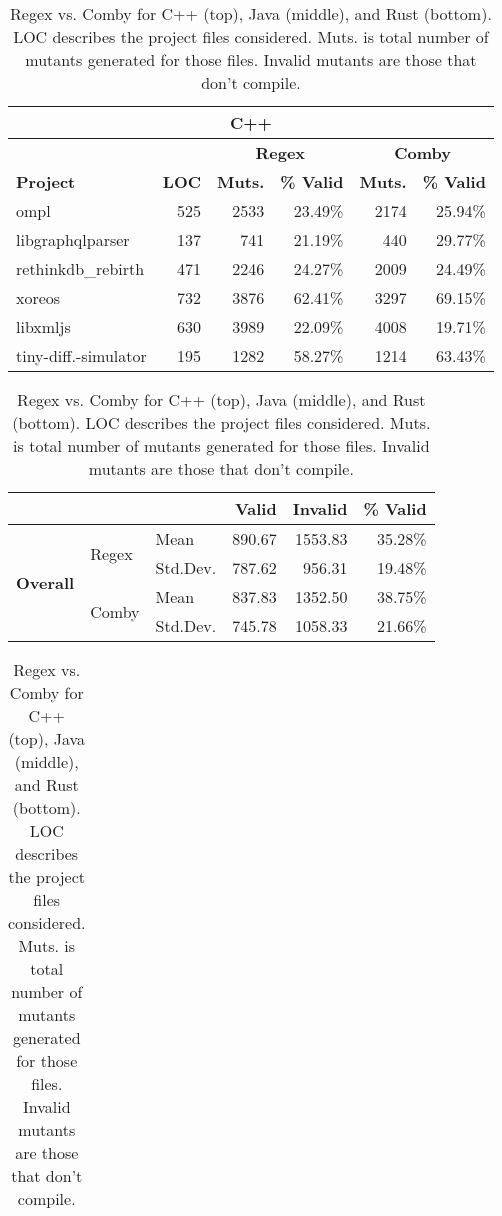 \documentclass[sigconf,review, anonymous]{acmart}
\newcommand{\mc}[3]{\multicolumn{#1}{#2}{#3}}
\begin{document}
{%
\begin{table}[hbtp]
\centering
\caption{\small Regex vs. Comby for C++ (top), Java (middle), and Rust (bottom). LOC describes the project files considered. Muts. is total number of mutants generated for those files. Invalid mutants are those that don't compile.}
\label{tab:table_cpp1javarust}
\begin{tabularx}{\columnwidth}{X|r|rr|rr}
\bottomrule\toprule
\mc{6}{c}{\textbf{C++}} \\\midrule
                 &              & \multicolumn{2}{c|}{\textbf{Regex}} &\multicolumn{2}{c}{\textbf{Comby}}  \\
\textbf{Project} & \textbf{LOC} & \textbf{Muts.} & \textbf{\% Valid} & \textbf{Muts.} &  \textbf{\% Valid} \\\midrule
ompl & 525 & 2533 & 23.49\% &  2174  & 25.94\%   \\
{\small libgraphqlparser} & 137 & 741 & 21.19\%  & 440 & 29.77\% \\
{\small rethinkdb\_rebirth} &471 & 2246 & 24.27\% & 2009 & 24.49\% \\
xoreos & 732  & 3876  & 62.41\% & 3297 & 69.15\% \\
libxmljs &630 &  3989 & 22.09\% & 4008 & 19.71\% \\[0.5ex]
tiny-diff.-simulator &  195 & 1282 &58.27\% & 1214 & 63.43\% \\
\bottomrule
\end{tabularx}
\begin{tabularx}{\columnwidth}{Xllrrr}
                  & &       & \textbf{Valid}  & \textbf{Invalid}  & \textbf{\% Valid} \\\midrule
 \multirow{4}{*}{\textbf{Overall}} & \multirow{2}{*}{Regex} & Mean     & 890.67 &  1553.83 & 35.28\% \\
                          & & Std.Dev. & 787.62 & 956.31   & 19.48\%  \\\cline{2-6}
  & \multirow{2}{*}{Comby}  & Mean     & 837.83 & 1352.50 & 38.75\%  \\
                         & & Std.Dev. & 745.78 & 1058.33& 21.66\%  \\\bottomrule
 \end{tabularx}
\begin{tabularx}{\columnwidth}{X|r|cr|cr}

\end{tabularx}
\end{table}}
\end{document}

